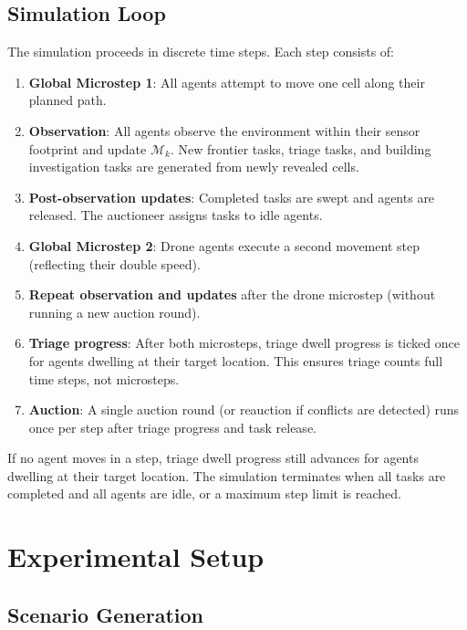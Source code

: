 \documentclass[conference]{IEEEtran}
\begin{document}
\subsection{Simulation Loop}

The simulation proceeds in discrete time steps. Each step consists of:
\begin{enumerate}
    \item \textbf{Global Microstep 1}: All agents attempt to move one cell along their planned path.
    \item \textbf{Observation}: All agents observe the environment within their sensor footprint and update $\mathcal{M}_k$. New frontier tasks, triage tasks, and building investigation tasks are generated from newly revealed cells.
    \item \textbf{Post-observation updates}: Completed tasks are swept and agents are released. The auctioneer assigns tasks to idle agents.
    \item \textbf{Global Microstep 2}: Drone agents execute a second movement step (reflecting their double speed).
    \item \textbf{Repeat observation and updates} after the drone microstep (without running a new auction round).
    \item \textbf{Triage progress}: After both microsteps, triage dwell progress is ticked once for agents dwelling at their target location. This ensures triage counts full time steps, not microsteps.
    \item \textbf{Auction}: A single auction round (or reauction if conflicts are detected) runs once per step after triage progress and task release.
\end{enumerate}

If no agent moves in a step, triage dwell progress still advances for agents dwelling at their target location. The simulation terminates when all tasks are completed and all agents are idle, or a maximum step limit is reached.

\section{Experimental Setup}

\subsection{Scenario Generation}
\end{document}
